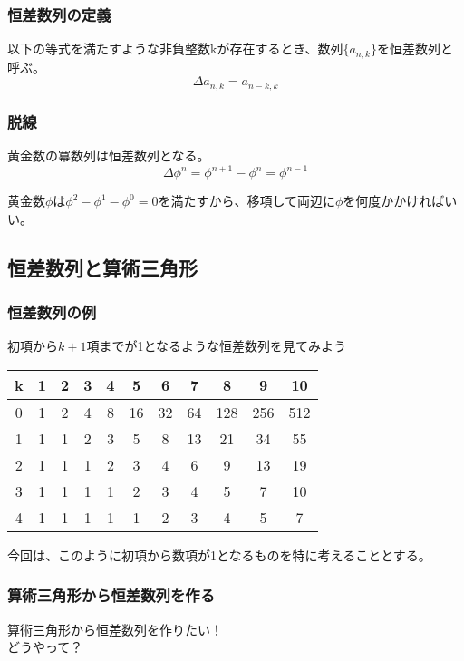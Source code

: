\documentclass[dvipdfmx,12pt]{beamer}
\begin{document}
\begin{frame}
\frametitle{恒差数列の定義}
\begin{definition}
以下の等式を満たすような非負整数kが存在するとき、数列$\{a_{n,k}\}$を恒差数列と呼ぶ。
$$
\Delta a_{n,k}=a_{n-k,k}
$$
\end{definition}
\end{frame}

\begin{frame}
\frametitle{脱線}
\begin{theorem}
黄金数の冪数列は恒差数列となる。
$$
\Delta \phi^n=\phi^{n+1}-\phi^n=\phi^{n-1}
$$
\end{theorem}
黄金数$\phi$は$\phi^2-\phi^1-\phi^0=0$を満たすから、移項して両辺に$\phi$を何度かかければいい。
\end{frame}

\subsection{恒差数列と算術三角形}
\begin{frame}
\frametitle{恒差数列の例}
初項から$k+1$項までが1となるような恒差数列を見てみよう
\begin{table}
\begin{tabular}{c||c|c|c|c|c|c|c|c|c|c}
k&1&2&3&4&5&6&7&8&9&10\\ \hline \hline
0&1&2&4&8&16&32&64&128&256&512\\ \hline
1&1&1&2&3&5&8&13&21&34&55\\ \hline
2&1&1&1&2&3&4&6&9&13&19\\ \hline
3&1&1&1&1&2&3&4&5&7&10\\ \hline
4&1&1&1&1&1&2&3&4&5&7
\end{tabular}
\end{table}
今回は、このように初項から数項が1となるものを特に考えることとする。
\end{frame}

\begin{frame}
\frametitle{算術三角形から恒差数列を作る}
\Large{
算術三角形から恒差数列を作りたい！\\
\vspace{0.5cm}
どうやって？
}
\end{frame}
\end{document}
